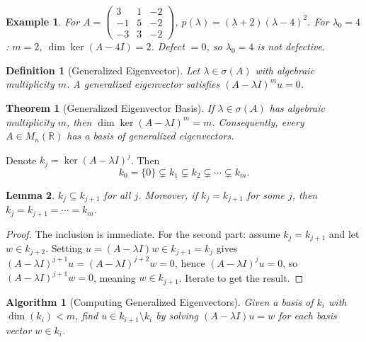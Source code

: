\documentclass{article}
\newtheorem{theorem}{Theorem}
\newtheorem{lemma}[theorem]{Lemma}
\newtheorem{definition}{Definition}
\newtheorem*{example}{Example}
\newtheorem{algorithm}{Algorithm}
\newcommand{\R}{\mathbb{R}}
\begin{document}
\begin{example}
    For $A = \begin{pmatrix}3&1&-2\\-1&5&-2\\-3&3&-2\end{pmatrix}$, 
    $p(\lambda) = (\lambda+2)(\lambda-4)^2$. For $\lambda_0 = 4$: 
    $m = 2$, $\dim\ker(A-4I) = 2$. Defect $= 0$, so 
    $\lambda_0 = 4$ is \emph{not} defective.
\end{example}

\begin{definition}[Generalized Eigenvector]
    Let $\lambda \in \sigma(A)$ with algebraic multiplicity $m$. 
    A \emph{generalized eigenvector} satisfies 
    $(A - \lambda I)^m u = 0$.
\end{definition}

\begin{theorem}[Generalized Eigenvector Basis]
    If $\lambda \in \sigma(A)$ has algebraic multiplicity $m$, then
    $\dim\ker(A-\lambda I)^m = m$. Consequently, every 
    $A \in M_n(\R)$ has a basis of generalized eigenvectors.
\end{theorem}

Denote $k_j = \ker(A-\lambda I)^j$. Then
\[k_0 = \{0\} \subsetneq k_1 \subsetneq k_2 \subsetneq 
\cdots \subsetneq k_m.\]

\begin{lemma}
    $k_j \subseteq k_{j+1}$ for all $j$. Moreover, if 
    $k_j = k_{j+1}$ for some $j$, then 
    $k_j = k_{j+1} = \cdots = k_m$.
\end{lemma}

\begin{proof}
    The inclusion is immediate. For the second part: assume 
    $k_j = k_{j+1}$ and let $w \in k_{j+2}$. Setting 
    $u = (A-\lambda I)w \in k_{j+1} = k_j$ gives 
    $(A-\lambda I)^{j+1}u = (A-\lambda I)^{j+2}w = 0$, hence 
    $(A-\lambda I)^j u = 0$, so $(A-\lambda I)^{j+1}w = 0$, meaning 
    $w \in k_{j+1}$. Iterate to get the result.
\end{proof}

\begin{algorithm}[Computing Generalized Eigenvectors]
    Given a basis of $k_i$ with $\dim(k_i) < m$, find 
    $u \in k_{i+1} \setminus k_i$ by solving
    $(A - \lambda I)u = w$ for each basis vector $w \in k_i$.
\end{algorithm}
\end{document}
